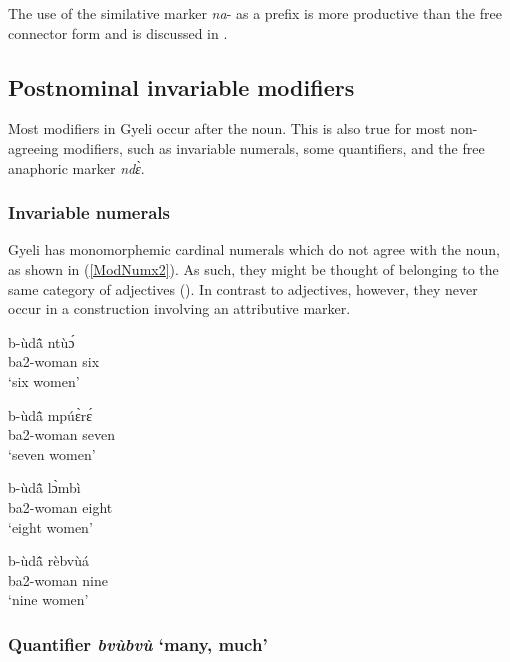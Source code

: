 \noindent  The use of the similative marker {\itshape na}- as a prefix is more productive than the free connector form and is discussed in .





\subsection{Postnominal invariable modifiers}
\label{sec:InvQUANT2}

Most modifiers in Gyeli occur after the noun. This is also true for most non-agreeing modifiers, such as invariable numerals, some quantifiers, and the free anaphoric marker {\itshape ndɛ̀}.

\subsubsection{Invariable numerals} 
\label{sec:InvNUM}


Gyeli has monomorphemic cardinal numerals which do not agree with the noun, as shown in (\ref{ModNumx2}). As such, they might be thought of belonging to the same category of adjectives (). In contrast to adjectives, however, they never occur in a construction involving an attributive marker.

\begin {exe} \ex\label {ModNumx2}
\begin{xlist}
\parbox[t]{2in}{ \ex \gll
 b-ùdã̂ ntùɔ́\\ 
ba2-woman six \\
`six women'}
\parbox[t]{2in}{ \ex \gll
b-ùdã̂ mpúɛ̀rɛ́ \\
   ba2-woman seven \\
 `seven women'}


\parbox[t]{2in}{ \ex \gll
 b-ùdã̂ lɔ̀mbì\\ 
ba2-woman eight \\
`eight women'}
\parbox[t]{2in}{ \ex \gll
b-ùdã̂ rèbvùá \\
   ba2-woman nine \\
 `nine women'}
\end{xlist}
\end {exe}


\subsubsection{Quantifier {\itshape bvùbvù} `many, much'} 

